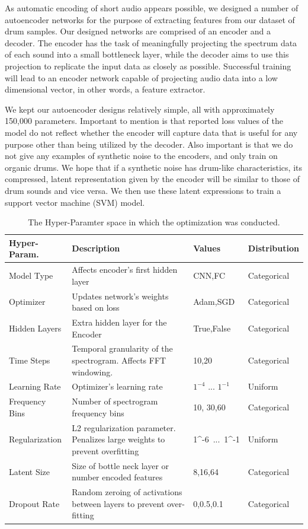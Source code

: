 \documentclass[\main/thesis.tex]{subfiles}
\begin{document}
As automatic encoding of short audio appears possible, we designed a number of autoencoder networks for the purpose of extracting features from our dataset of drum samples. Our designed networks are comprised of an encoder and a decoder. The encoder has the task of meaningfully projecting the spectrum data of each sound into a small bottleneck layer, while the decoder aims to use this projection to replicate the input data as closely as possible. Successful training will lead to an encoder network capable of projecting audio data into a low dimensional vector, in other words, a feature extractor. 

We kept our autoencoder designs relatively simple, all with approximately 150,000 parameters. Important to mention is that reported loss values of the model do not reflect whether the encoder will capture data that is useful for any purpose other than being utilized by the decoder. Also important is that we do not give any examples of synthetic noise to the encoders, and only train on organic drums. We hope that if a synthetic noise has drum-like characteristics, its compressed, latent representation given by the encoder will be similar to those of drum sounds and vice versa. We then use these latent expressions to train a support vector machine (SVM) model.
\begin{table}[h!]
\label{table:hyper_prams}
\begin{tabular}{|p{28mm}|p{50mm}|p{21mm}|p{21mm}|}
\hline
Hyper-Param. & Description  & Values & Distribution\\ \hline
Model Type      &   Affects encoder's first hidden layer & CNN,FC & Categorical \\  \hline
Optimizer       & Updates network's weights based on loss & Adam,SGD & Categorical  \\  \hline
Hidden Layers   & Extra hidden layer for the Encoder & True,False & Categorical \\  \hline
Time Steps & Temporal granularity of the spectrogram. Affects FFT windowing. & 10,20 & Categorical  \\ \hline
Learning Rate   &    Optimizer's learning rate  & $1^{-4}$ ... $1^{-1}$ & Uniform      \\ \hline
Frequency Bins & Number of spectrogram frequency bins & 10, 30,60 & Categorical \\ \hline

Regularization  &  L2 regularization parameter. Penalizes large weights to prevent overfitting & 1^{-6}~...~1^{-1} & Uniform\\ \hline
Latent Size & Size of bottle neck layer or number encoded features & 8,16,64 & Categorical              \\ \hline
Dropout Rate & Random zeroing of activations between layers to prevent over-fitting & 0,0.5,0.1 & Categorical\\  \hline
\end{tabular}
\caption{The Hyper-Paramter space in which the optimization was conducted.}
\end{table}
\end{document}
